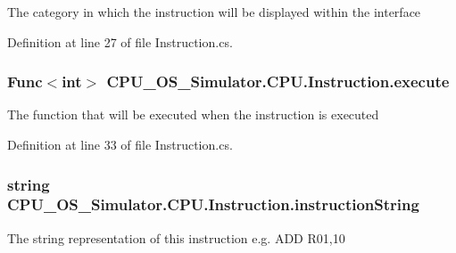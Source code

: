 The category in which the instruction will be displayed within the interface 



Definition at line 27 of file Instruction.\+cs.

\hypertarget{class_c_p_u___o_s___simulator_1_1_c_p_u_1_1_instruction_ae6c5e3409f33f49c745ab57ca9a885a9}{}
\subsubsection[{execute}]{\setlength{\rightskip}{0pt plus 5cm}Func$<$int$>$ C\+P\+U\+\_\+\+O\+S\+\_\+\+Simulator.\+C\+P\+U.\+Instruction.\+execute\hspace{0.3cm}{\ttfamily [private]}}\label{class_c_p_u___o_s___simulator_1_1_c_p_u_1_1_instruction_ae6c5e3409f33f49c745ab57ca9a885a9}


The function that will be executed when the instruction is executed 



Definition at line 33 of file Instruction.\+cs.

\hypertarget{class_c_p_u___o_s___simulator_1_1_c_p_u_1_1_instruction_ab58373ca153de047b36c1036e07db7a8}{}
\subsubsection[{instruction\+String}]{\setlength{\rightskip}{0pt plus 5cm}string C\+P\+U\+\_\+\+O\+S\+\_\+\+Simulator.\+C\+P\+U.\+Instruction.\+instruction\+String\hspace{0.3cm}{\ttfamily [private]}}\label{class_c_p_u___o_s___simulator_1_1_c_p_u_1_1_instruction_ab58373ca153de047b36c1036e07db7a8}


The string representation of this instruction e.\+g. A\+D\+D R01,10 



